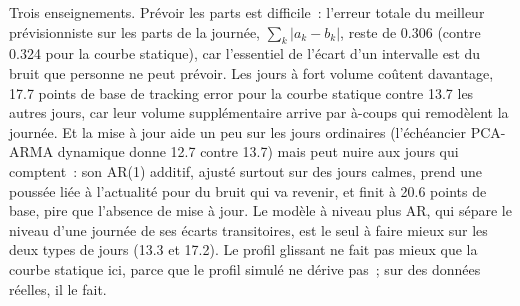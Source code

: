 \begin{omfigure}

\label{fig:mx:benchmark-algorithms:forecast}
\end{omfigure}

Trois enseignements. Prévoir les parts est difficile~: l'erreur totale du meilleur prévisionniste sur les parts de la journée, $\sum_k|a_k-b_k|$, reste de 0.306 (contre 0.324 pour
la courbe statique), car l'essentiel de l'écart d'un intervalle est du bruit que personne ne peut prévoir. Les jours à fort volume coûtent davantage, 17.7 points de base de tracking error pour
la courbe statique contre 13.7 les autres jours, car leur volume supplémentaire arrive par à-coups qui remodèlent la journée. Et la mise à jour aide un peu sur les
jours ordinaires (l'échéancier PCA-ARMA dynamique donne 12.7 contre 13.7) mais peut nuire aux jours qui comptent~: son AR(1) additif, ajusté surtout sur des jours calmes,
prend une poussée liée à l'actualité pour du bruit qui va revenir, et finit à 20.6 points de base, pire que l'absence de mise à jour. Le modèle à niveau plus AR, qui sépare le niveau
d'une journée de ses écarts transitoires, est le seul à faire mieux sur les deux types de jours (13.3 et 17.2). Le profil glissant ne fait pas mieux que
la courbe statique ici, parce que le profil simulé ne dérive pas~; sur des données réelles, il le fait.

